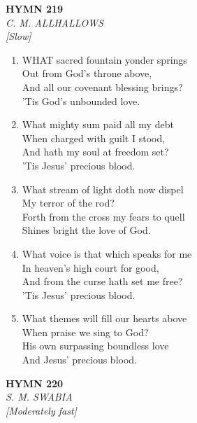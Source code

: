 \newpage
\begin{center}
    {\Large \textbf{HYMN 219}}
    \\
    \textit{C. M. ALLHALLOWS}
    \\
    \textit{\small [Slow]}
\end{center}
\vspace{1em}

\begin{enumerate}
    \item WHAT sacred fountain yonder springs \\
            Out from God's throne above, \\
        And all our covenant blessing brings? \\
            'Tis God's unbounded love.

    \item What mighty sum paid all my debt \\
            When charged with guilt I stood, \\
        And hath my soul at freedom set? \\
            'Tis Jesus' precious blood.

    \item What stream of light doth now dispel \\
            My terror of the rod? \\
        Forth from the cross my fears to quell \\
            Shines bright the love of God.

    \item What voice is that which speaks for me \\
            In heaven's high court for good, \\
        And from the curse hath set me free? \\
            'Tis Jesus' precious blood.

    \item What themes will fill our hearts above \\
            When praise we sing to God? \\
        His own surpassing boundless love \\
            And Jesus' precious blood.

\end{enumerate}

\newpage
\begin{center}
    {\Large \textbf{HYMN 220}}
    \\
    \textit{S. M. SWABIA}
    \\
    \textit{\small [Moderately fast]}
\end{center}
\vspace{1em}

